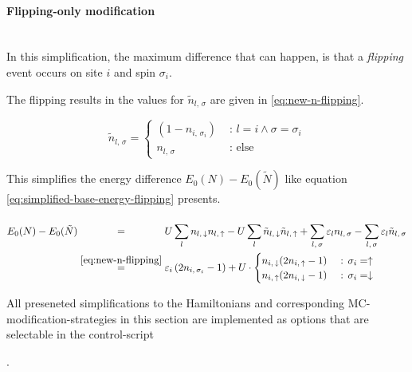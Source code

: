 
\paragraph*{Flipping-only modification} \makebox{}\\

In this simplification, the maximum difference that can happen, is that a \emph{flipping} event occurs on site $i$ and spin $\sigma_i$. 

The flipping results in the values for $\tilde{n}_{l,\,\sigma}$ are given in \autoref{eq:new-n-flipping}.

\begin{equation}
    \label{eq:new-n-flipping}
    \tilde{n}_{l,\,\sigma} = \begin{cases}
        (1 - n_{i,\,\sigma_i})&\text{ : } l = i \land \sigma = \sigma_i   \\
        n_{l,\,\sigma} &\text{ : else}
    \end{cases}
\end{equation}

This simplifies the energy difference $E_0(N)-E_0(\tilde{N})$ like equation \autoref{eq:simplified-base-energy-flipping} presents.

\begin{equation}
    \label{eq:simplified-base-energy-flipping}
    \begin{split}
        E_0(N)-E_0(\tilde{N}) 
        &\stackrel{\phantom{\ref{eq:new-n-flipping}}}{=} U\lsum n_{l,\,\down}n_{l,\,\up}-U\lsum \tilde{n}_{l,\,\down}\tilde{n}_{l,\,\up} 
        + \lsum[l,\,\sigma] \epsl n_{l,\,\sigma} - \lsum[l,\,\sigma] \epsl \tilde{n}_{l,\,\sigma}\\
        &\stackrel{\ref{eq:new-n-flipping}}{=} \epsl[i] \left(2 n_{i,\,\sigma_i} - 1\right) +
        U\cdot \begin{cases}
            n_{i,\,\down} (2 n_{i,\,\up} - 1) &\text{ : } \sigma_i = \up   \\
            n_{i,\,\up} (2 n_{i,\,\down} - 1) &\text{ : } \sigma_i = \down 
        \end{cases}
    \end{split}
\end{equation}


\vspace{1cm}
All preseneted simplifications to the Hamiltonians and corresponding MC-modification-strategies in this section are implemented as options that are selectable in the control-script   

.
 